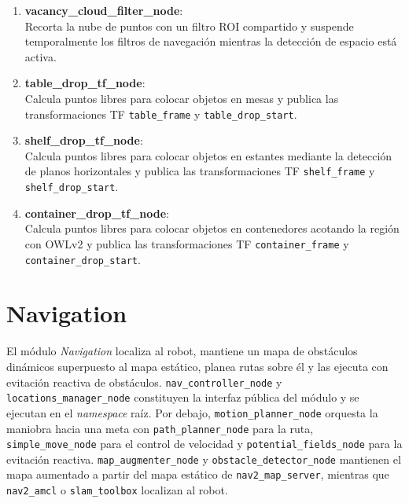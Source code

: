 \begin{enumerate}
    \item \textbf{vacancy\_cloud\_filter\_node}: \\
    Recorta la nube de puntos con un filtro ROI compartido y suspende temporalmente los filtros de navegación mientras la detección de espacio está activa.

    \item \textbf{table\_drop\_tf\_node}: \\
    Calcula puntos libres para colocar objetos en mesas y publica las transformaciones TF \texttt{table\_frame} y \texttt{table\_drop\_start}.

    \item \textbf{shelf\_drop\_tf\_node}: \\
    Calcula puntos libres para colocar objetos en estantes mediante la detección de planos horizontales y publica las transformaciones TF \texttt{shelf\_frame} y \texttt{shelf\_drop\_start}.

    \item \textbf{container\_drop\_tf\_node}: \\
    Calcula puntos libres para colocar objetos en contenedores acotando la región con OWLv2 y publica las transformaciones TF \texttt{container\_frame} y \texttt{container\_drop\_start}.
\end{enumerate}


\section[Navigation]{Navigation}
\label{app:justina_navigation}

El módulo \textit{Navigation} localiza al robot, mantiene un mapa de obstáculos dinámicos superpuesto al mapa estático, planea rutas sobre él y las ejecuta con evitación reactiva de obstáculos. \texttt{nav\_controller\_node} y \texttt{locations\_manager\_node} constituyen la interfaz pública del módulo y se ejecutan en el \textit{namespace} raíz. Por debajo, \texttt{motion\_planner\_node} orquesta la maniobra hacia una meta con \texttt{path\_planner\_node} para la ruta, \texttt{simple\_move\_node} para el control de velocidad y \texttt{potential\_fields\_node} para la evitación reactiva. \texttt{map\_augmenter\_node} y \texttt{obstacle\_detector\_node} mantienen el mapa aumentado a partir del mapa estático de \texttt{nav2\_map\_server}, mientras que \texttt{nav2\_amcl} o \texttt{slam\_toolbox} localizan al robot.

